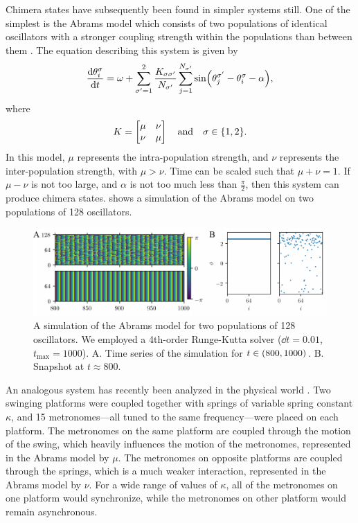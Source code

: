 Chimera states have subsequently been found in simpler systems still.
One of the simplest is the Abrams model which consists of two populations of identical oscillators with a stronger coupling strength within the populations than between them \cite{Abrams2008}.
The equation describing this system is given by
\begin{equation}
  \label{eq:abrams}
  \dv{\theta_{i}^{\sigma}}{t}
  =
  \omega
  +
  \sum_{\sigma' = 1}^{2} \frac{K_{\sigma \sigma'}}{N_{\sigma'}} \sum_{j = 1}^{N_{\sigma'}} \sin(\theta_{j}^{\sigma'} - \theta_{i}^{\sigma} - \alpha),
\end{equation}
where
\begin{equation*}
  K
  =
  \bmqty{\mu & \nu \\ \nu & \mu}
  \qand
  \sigma \in \Bqty{1, 2}.
\end{equation*}
In this model, $\mu$ represents the intra-population strength, and $\nu$ represents the inter-population strength, with $\mu > \nu$.
Time can be scaled such that $\mu + \nu = 1$.
If $\mu - \nu$ is not too large, and $\alpha$ is not too much less than $\frac{\pi}{2}$, then this system can produce chimera states.
 shows a simulation of the Abrams model on two populations of 128 oscillators.
\begin{figure}[ht]
  \centering
  \includegraphics[width=\textwidth]{figure/abrams.pdf}
  \caption[Abrams simulation]{A simulation of the Abrams model for two populations of 128 oscillators.
    We employed a 4th-order Runge-Kutta solver ($\dd{t} = 0.01$, $t_{\text{max}} = 1000$).
    A. Time series of the simulation for $t \in \pqty{800, 1000}$.
    B. Snapshot at $t \approx 800$.
  }
  \label{fig:abrams}
\end{figure}

An analogous system has recently been analyzed in the physical world \cite{Martens2013}.
Two swinging platforms were coupled together with springs of variable spring constant $\kappa$, and 15 metronomes---all tuned to the same frequency---were placed on each platform.
The metronomes on the same platform are coupled through the motion of the swing, which heavily influences the motion of the metronomes, represented in the Abrams model by $\mu$.
The metronomes on opposite platforms are coupled through the springs, which is a much weaker interaction, represented in the Abrams model by $\nu$.
For a wide range of values of $\kappa$, all of the metronomes on one platform would synchronize, while the metronomes on other platform would remain asynchronous.

